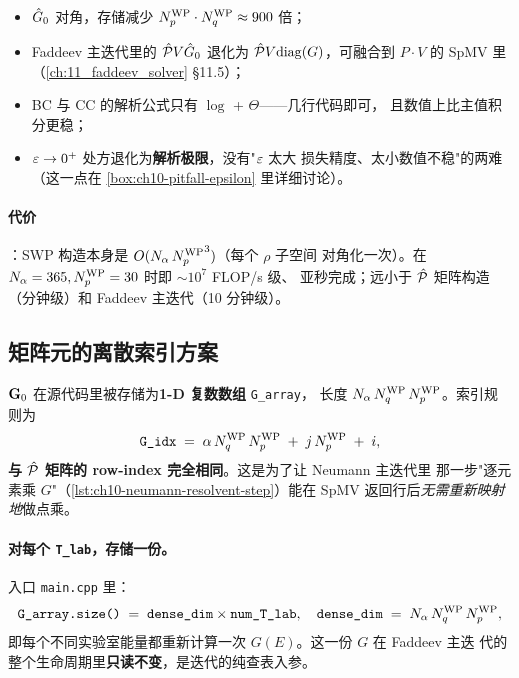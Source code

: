 \begin{itemize}
  \item \(\hat{G}_0\) 对角，存储减少 \({N_{p}^{\text{WP}}} \cdot {N_{q}^{\text{WP}}} \approx 900\) 倍；
  \item Faddeev 主迭代里的 \(\hat{\mathcal{P}} V \hat{G}_0\) 退化为
        \(\hat{\mathcal{P}} V \mathrm{diag}(G)\)，可融合到 \(P \cdot V\) 的 SpMV
        里（\cref{ch:11_faddeev_solver} \S 11.5）；
  \item BC 与 CC 的解析公式只有 \(\log\) + \(\Theta\)——几行代码即可，
        且数值上比主值积分更稳；
  \item \(\varepsilon \to 0^{+}\) 处方退化为\textbf{解析极限}，没有"\(\varepsilon\) 太大
        损失精度、太小数值不稳"的两难（这一点在
        \cref{box:ch10-pitfall-epsilon} 里详细讨论）。
\end{itemize}

\paragraph{代价}：SWP 构造本身是 \(O(N_\alpha\, {N_{p}^{\text{WP}}}^3)\)（每个 \(\rho\) 子空间
对角化一次）。在 \(N_\alpha=365, {N_{p}^{\text{WP}}}=30\) 时即 \(\sim 10^{7}\) FLOP/s 级、
亚秒完成；远小于 \(\hat{\mathcal{P}}\) 矩阵构造（分钟级）和 Faddeev 主迭代（10 分钟级）。

\subsection{矩阵元的离散索引方案}
\label{subsec:ch10-indexing}

\(\mathbf{G}_0\) 在源代码里被存储为\textbf{1-D 复数数组} \texttt{G\_array}，
长度 \(N_\alpha\, {N_{q}^{\text{WP}}}\, {N_{p}^{\text{WP}}}\)。索引规则为
\begin{equation}
\label{eq:ch10-G-idx}
\texttt{G\_idx}\;=\;
\alpha\, {N_{q}^{\text{WP}}}\, {N_{p}^{\text{WP}}} \;+\; j\, {N_{p}^{\text{WP}}} \;+\; i,
\end{equation}
\textbf{与 \(\hat{\mathcal{P}}\) 矩阵的 row-index 完全相同}。这是为了让 Neumann 主迭代里
那一步"逐元素乘 \(G\)"（\cref{lst:ch10-neumann-resolvent-step}）能在 SpMV
返回行后\emph{无需重新映射地}做点乘。

\paragraph{对每个 \texttt{T\_lab}，存储一份。}
入口 \texttt{main.cpp} 里：
\begin{equation*}
\texttt{G\_array.size()}\;=\; \texttt{dense\_dim} \times \texttt{num\_T\_lab},
\quad
\texttt{dense\_dim}\;=\; N_\alpha\, {N_{q}^{\text{WP}}}\, {N_{p}^{\text{WP}}},
\end{equation*}
即每个不同实验室能量都重新计算一次 \(G(E)\)。这一份 \(G\) 在 Faddeev 主迭
代的整个生命周期里\textbf{只读不变}，是迭代的纯查表入参。

